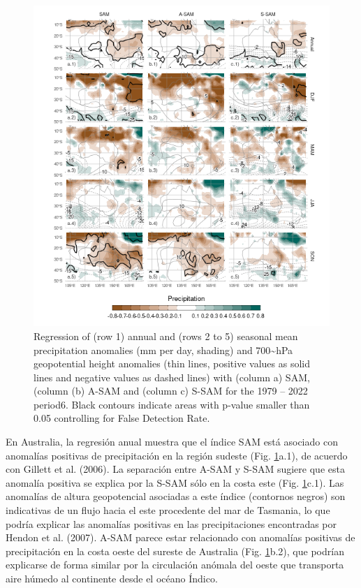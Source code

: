 \documentclass[12pt,oneside]{reedthesis}
\begin{document}
\begin{figure}
\includegraphics{figures/30-sam/pp-regr-oceania-1} \caption{Regression of (row 1) annual and (rows 2 to 5) seasonal mean precipitation anomalies (mm per day, shading) and 700\textasciitilde hPa geopotential height anomalies (thin lines, positive values as solid lines and negative values as dashed lines) with (column a) SAM, (column (b) A-SAM and (column c) S-SAM for the 1979 -- 2022 period6.
Black contours indicate areas with p-value smaller than 0.05 controlling for False Detection Rate.}\label{fig:pp-regr-oceania}
\end{figure}

En Australia, la regresión anual muestra que el índice SAM está asociado con anomalías positivas de precipitación en la región sudeste (Fig. \ref{fig:pp-regr-oceania}a.1), de acuerdo con Gillett et al. (2006).
La separación entre A-SAM y S-SAM sugiere que esta anomalía positiva se explica por la S-SAM sólo en la costa este (Fig. \ref{fig:pp-regr-oceania}c.1).
Las anomalías de altura geopotencial asociadas a este índice (contornos negros) son indicativas de un flujo hacia el este procedente del mar de Tasmania, lo que podría explicar las anomalías positivas en las precipitaciones encontradas por Hendon et al. (2007).
A-SAM parece estar relacionado con anomalías positivas de precipitación en la costa oeste del sureste de Australia (Fig. \ref{fig:pp-regr-oceania}b.2), que podrían explicarse de forma similar por la circulación anómala del oeste que transporta aire húmedo al continente desde el océano Índico.
\end{document}
